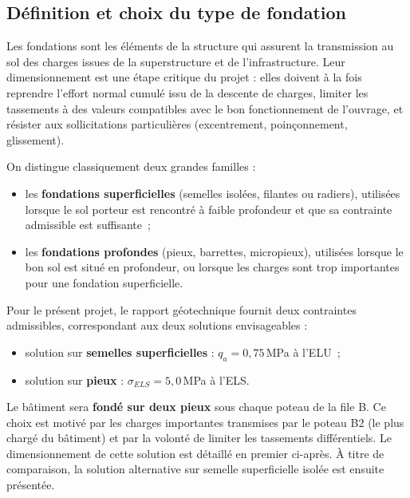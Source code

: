 
\subsection{Définition et choix du type de fondation}

Les fondations sont les éléments de la structure qui assurent la transmission au sol des charges issues de la superstructure et de l'infrastructure. Leur dimensionnement est une étape critique du projet : elles doivent à la fois reprendre l'effort normal cumulé issu de la descente de charges, limiter les tassements à des valeurs compatibles avec le bon fonctionnement de l'ouvrage, et résister aux sollicitations particulières (excentrement, poinçonnement, glissement).

On distingue classiquement deux grandes familles :
\begin{itemize}
  \item les \textbf{fondations superficielles} (semelles isolées, filantes ou radiers), utilisées lorsque le sol porteur est rencontré à faible profondeur et que sa contrainte admissible est suffisante~;
  \item les \textbf{fondations profondes} (pieux, barrettes, micropieux), utilisées lorsque le bon sol est situé en profondeur, ou lorsque les charges sont trop importantes pour une fondation superficielle.
\end{itemize}

Pour le présent projet, le rapport géotechnique fournit deux contraintes admissibles, correspondant aux deux solutions envisageables :
\begin{itemize}
  \item solution sur \textbf{semelles superficielles} : $q_a = 0{,}75$\,MPa à l'ELU~;
  \item solution sur \textbf{pieux} : $\sigma_{ELS} = 5{,}0$\,MPa à l'ELS.
\end{itemize}

Le bâtiment sera \textbf{fondé sur deux pieux} sous chaque poteau de la file B. Ce choix est motivé par les charges importantes transmises par le poteau B2 (le plus chargé du bâtiment) et par la volonté de limiter les tassements différentiels. Le dimensionnement de cette solution est détaillé en premier ci-après. À titre de comparaison, la solution alternative sur semelle superficielle isolée est ensuite présentée.


